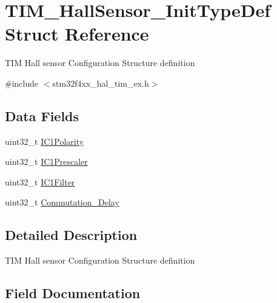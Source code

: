 \hypertarget{struct_t_i_m___hall_sensor___init_type_def}{}\section{T\+I\+M\+\_\+\+Hall\+Sensor\+\_\+\+Init\+Type\+Def Struct Reference}
\label{struct_t_i_m___hall_sensor___init_type_def}


T\+IM Hall sensor Configuration Structure definition ~\newline
  




{\ttfamily \#include $<$stm32f4xx\+\_\+hal\+\_\+tim\+\_\+ex.\+h$>$}

\subsection*{Data Fields}
\begin{DoxyCompactItemize}
\item 
uint32\+\_\+t \mbox{\hyperlink{struct_t_i_m___hall_sensor___init_type_def_ac1191c7421a3ca4c53ec7875870812e5}{I\+C1\+Polarity}}
\item 
uint32\+\_\+t \mbox{\hyperlink{struct_t_i_m___hall_sensor___init_type_def_aa913a8df0a4c97fefa87ff760fae10cb}{I\+C1\+Prescaler}}
\item 
uint32\+\_\+t \mbox{\hyperlink{struct_t_i_m___hall_sensor___init_type_def_a5efa2ad5085fe72fb0b5dc2e2fc61def}{I\+C1\+Filter}}
\item 
uint32\+\_\+t \mbox{\hyperlink{struct_t_i_m___hall_sensor___init_type_def_a5d74bf14283eb95439d6d37952274f07}{Commutation\+\_\+\+Delay}}
\end{DoxyCompactItemize}


\subsection{Detailed Description}
T\+IM Hall sensor Configuration Structure definition ~\newline
 

\subsection{Field Documentation}
\mbox{\label{struct_t_i_m___hall_sensor___init_type_def_a5d74bf14283eb95439d6d37952274f07}} 
